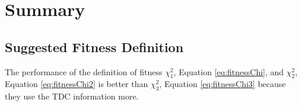 %
%
%
%
%
%
%
%
%


\section {Summary}
\subsection {Suggested Fitness Definition}

The performance of the definition of fitness $\chi^2_1$, Equation \ref{eq:fitnessChi}, and $\chi^2_2$, Equation \ref{eq:fitnessChi2} is
better than $\chi^2_3$, Equation \ref{eq:fitnessChi3} because they use the TDC information more.

